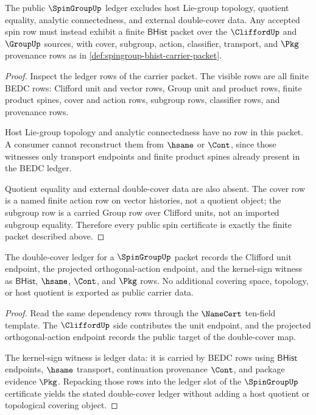 \begin{theorem}
\label{thm:spingroup-ledger-exclusion}
The public $\SpinGroupUp$ ledger excludes host Lie-group topology, quotient
equality, analytic connectedness, and external double-cover data. Any accepted
spin row must instead exhibit a finite $\mathsf{BHist}$ packet over the
$\CliffordUp$ and $\GroupUp$ sources, with cover, subgroup, action,
classifier, transport, and $\Pkg$ provenance rows as in
\autoref{def:spingroup-bhist-carrier-packet}.
\end{theorem}
\begin{proof}
Inspect the ledger rows of the carrier packet. The visible rows are all
finite BEDC rows: Clifford unit and vector rows, Group unit and product rows,
finite product spines, cover and action rows, subgroup rows, classifier rows,
and provenance rows.

Host Lie-group topology and analytic connectedness have no row in this
packet. A consumer cannot reconstruct them from $\hsame$ or $\Cont$, since
those witnesses only transport endpoints and finite product spines already
present in the BEDC ledger.

Quotient equality and external double-cover data are also absent. The cover
row is a named finite action row on vector histories, not a quotient object;
the subgroup row is a carried Group row over Clifford units, not an imported
subgroup equality. Therefore every public spin certificate is exactly the
finite packet described above.
\end{proof}

\begin{theorem}
\label{thm:spingroup-double-cover-ledger-obligation}
The double-cover ledger for a $\SpinGroupUp$ packet records the Clifford unit
endpoint, the projected orthogonal-action endpoint, and the kernel-sign witness
as $\mathsf{BHist}$, $\hsame$, $\Cont$, and $\Pkg$ rows. No additional covering
space, topology, or host quotient is exported as public carrier data.
\end{theorem}
\begin{proof}
Read the same dependency rows through the $\NameCert$ ten-field template. The
$\CliffordUp$ side contributes the unit endpoint, and the projected
orthogonal-action endpoint records the public target of the double-cover map.

The kernel-sign witness is ledger data: it is carried by BEDC rows using
$\mathsf{BHist}$ endpoints, $\hsame$ transport, continuation provenance
$\Cont$, and package evidence $\Pkg$. Repacking those rows into the ledger slot
of the $\SpinGroupUp$ certificate yields the stated double-cover ledger without
adding a host quotient or topological covering object.
\end{proof}

